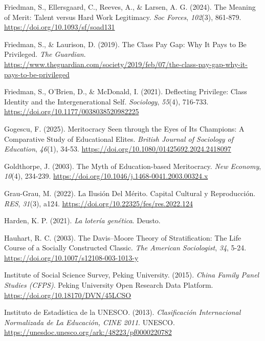 \documentclass[
  spanish,
  a4paper,
  oneside]{scrbook}
\newlength{\cslhangindent}
\newenvironment{CSLReferences}[2] %
 {\begin{list}{}{%
  \setlength{\itemindent}{0pt}
  \setlength{\leftmargin}{0pt}
  \setlength{\parsep}{0pt}
  \ifodd #1
   \setlength{\leftmargin}{\cslhangindent}
   \setlength{\itemindent}{-1\cslhangindent}
  \fi
  \setlength{\itemsep}{#2\baselineskip}}}
 {\end{list}}
\begin{document}
\begin{CSLReferences}{1}{0}
Friedman, S., Ellersgaard, C., Reeves, A., \& Larsen, A. G. (2024). The
{Meaning} of {Merit}: {Talent} versus {Hard Work Legitimacy}. \emph{Soc
Forces}, \emph{102}(3), 861-879.
\url{https://doi.org/10.1093/sf/soad131}

Friedman, S., \& Laurison, D. (2019). The Class Pay Gap: Why It Pays to
Be Privileged. \emph{The Guardian}.
\url{https://www.theguardian.com/society/2019/feb/07/the-class-pay-gap-why-it-pays-to-be-privileged}

Friedman, S., O'Brien, D., \& McDonald, I. (2021). Deflecting
{Privilege}: {Class Identity} and the {Intergenerational Self}.
\emph{Sociology}, \emph{55}(4), 716-733.
\url{https://doi.org/10.1177/0038038520982225}

Gogescu, F. (2025). Meritocracy Seen through the Eyes of Its Champions:
A Comparative Study of Educational Elites. \emph{British Journal of
Sociology of Education}, \emph{46}(1), 34-53.
\url{https://doi.org/10.1080/01425692.2024.2418097}

Goldthorpe, J. (2003). The Myth of Education-based Meritocracy.
\emph{New Economy}, \emph{10}(4), 234-239.
\url{https://doi.org/10.1046/j.1468-0041.2003.00324.x}

Grau-Grau, M. (2022). La Ilusión Del Mérito. {Capital} Cultural y
Reproducción. \emph{RES}, \emph{31}(3), a124.
\url{https://doi.org/10.22325/fes/res.2022.124}

Harden, K. P. (2021). \emph{{La lotería genética}}. Deusto.

Hauhart, R. C. (2003). The {Davis}--{Moore} Theory of Stratification:
{The} Life Course of a Socially Constructed Classic. \emph{The American
Sociologist}, \emph{34}, 5-24.
\url{https://doi.org/10.1007/s12108-003-1013-y}

Institute of Social Science Survey, Peking University. (2015).
\emph{China {Family Panel Studies} ({CFPS})}. Peking University Open
Research Data Platform. \url{https://doi.org/10.18170/DVN/45LCSO}

Instituto de Estadística de la UNESCO. (2013). \emph{Clasificación
Internacional Normalizada de La Educación, {CINE} 2011}. UNESCO.
\url{https://unesdoc.unesco.org/ark:/48223/pf0000220782}


\end{CSLReferences}
\end{document}
